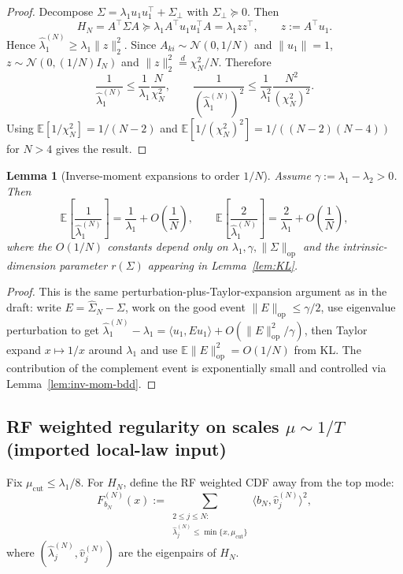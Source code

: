 \documentclass[11pt]{article}
\newtheorem{lemma}{Lemma}
\begin{document}
\begin{proof}
Decompose $\Sigma=\lambda_1 u_1u_1^\top+\Sigma_\perp$ with $\Sigma_\perp\succeq 0$. Then
\[
H_N=A^\top\Sigma A\succeq \lambda_1 A^\top u_1u_1^\top A = \lambda_1 z z^\top,\qquad z:=A^\top u_1.
\]
Hence $\widehat\lambda_1^{(N)}\ge \lambda_1\|z\|_2^2$. Since $A_{ki}\sim\mathcal N(0,1/N)$ and $\|u_1\|=1$,
$z\sim \mathcal N(0,(1/N)I_N)$ and $\|z\|_2^2\stackrel{d}{=}\chi^2_N/N$. Therefore
\[
\frac{1}{\widehat\lambda_1^{(N)}}\le \frac{1}{\lambda_1}\frac{N}{\chi^2_N},\qquad
\frac{1}{(\widehat\lambda_1^{(N)})^2}\le \frac{1}{\lambda_1^2}\frac{N^2}{(\chi^2_N)^2}.
\]
Using $\mathbb E[1/\chi^2_N]=1/(N-2)$ and $\mathbb E[1/(\chi^2_N)^2]=1/((N-2)(N-4))$ for $N>4$ gives the result.
\end{proof}

\begin{lemma}[Inverse-moment expansions to order $1/N$]\label{lem:inv-exp}
Assume $\gamma:=\lambda_1-\lambda_2>0$. Then
\[
\mathbb E\!\left[\frac{1}{\widehat\lambda_1^{(N)}}\right]=\frac{1}{\lambda_1}+O\!\left(\frac{1}{N}\right),
\qquad
\mathbb E\!\left[\frac{2}{\widehat\lambda_1^{(N)}}\right]=\frac{2}{\lambda_1}+O\!\left(\frac{1}{N}\right),
\]
where the $O(1/N)$ constants depend only on $\lambda_1,\gamma,\|\Sigma\|_{\mathrm{op}}$ and the
intrinsic-dimension parameter $r(\Sigma)$ appearing in Lemma~\ref{lem:KL}.
\end{lemma}

\begin{proof}
This is the same perturbation-plus-Taylor-expansion argument as in the draft: write $E=\widehat\Sigma_N-\Sigma$,
work on the good event $\|E\|_{\mathrm{op}}\le \gamma/2$, use eigenvalue perturbation to get
$\widehat\lambda_1^{(N)}-\lambda_1=\langle u_1,Eu_1\rangle+O(\|E\|_{\mathrm{op}}^2/\gamma)$,
then Taylor expand $x\mapsto 1/x$ around $\lambda_1$ and use $\mathbb E\|E\|_{\mathrm{op}}^2=O(1/N)$ from KL.
The contribution of the complement event is exponentially small and controlled via Lemma~\ref{lem:inv-mom-bdd}.
\end{proof}

\subsection{RF weighted regularity on scales $\mu\sim 1/T$ (imported local-law input)}

Fix $\mu_{\mathrm{cut}}\le \lambda_1/8$. For $H_N$, define the RF weighted CDF away from the top mode:
\[
F^{(N)}_{b_N}(x):=\sum_{\substack{2\le j\le N:\\ \widehat\lambda_j^{(N)}\le \min\{x,\mu_{\mathrm{cut}}\}}}
\langle b_N,\widehat v_j^{(N)}\rangle^2,
\]
where $(\widehat\lambda_j^{(N)},\widehat v_j^{(N)})$ are the eigenpairs of $H_N$.
\end{document}
